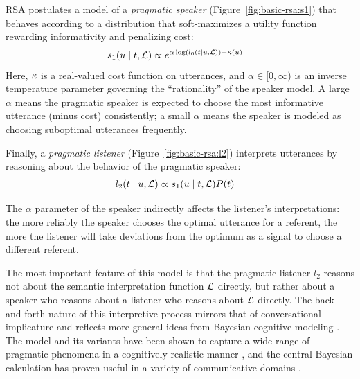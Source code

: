 \documentclass[11pt,letterpaper]{article}
\newcommand{\term}{\textit}
\newcommand{\utt}{u}
\newcommand{\target}{t}
\renewcommand{\|}{\mid}
\newcommand{\figref}[1]{Figure~\ref{#1}}
\begin{document}
RSA postulates a model of a \term{pragmatic speaker} (\figref{fig:basic-rsa:s1}) that
behaves according to a distribution that soft-maximizes
a utility function rewarding informativity and penalizing cost:
\begin{align}
  s_{1}(\utt \| \target, \Lex)
  &\propto
  e^{\alpha\log(l_{0}(\target \| \utt, \Lex)) - \Costs(\utt)}
  \label{eq:rsa-s1}
\end{align}
Here, $\kappa$ is a real-valued cost function on utterances, and
$\alpha \in [0,\infty)$ is an inverse temperature parameter governing
the ``rationality'' of the speaker model.
A large $\alpha$ means the pragmatic speaker is expected to choose
the most informative utterance (minus cost)
consistently; a small $\alpha$ means the
speaker is modeled as choosing suboptimal utterances frequently.

Finally, a \term{pragmatic listener} (\figref{fig:basic-rsa:l2})
interprets utterances by reasoning about the behavior of the pragmatic speaker:
\begin{align}
  l_{2}(\target \| \utt, \Lex)
  &\propto
  s_{1}(\utt \| \target, \Lex) \targetPrior(\target)
  \label{eq:rsa-l2}
\end{align}

The $\alpha$ parameter of the speaker indirectly affects the
listener's interpretations: the more reliably the speaker
chooses the optimal utterance for a referent, the more the listener
will take deviations from the optimum as a signal to choose a
different referent.

The most important feature of this model is that the pragmatic
listener $l_{2}$ reasons not about the semantic interpretation
function $\mathcal{L}$ directly, but rather about a speaker who reasons about
a listener who reasons about $\mathcal{L}$ directly. The back-and-forth
nature of this interpretive process mirrors
that of conversational implicature \cite{Grice75} and
reflects more general ideas from Bayesian cognitive modeling
\cite{Tenenbaum-etal:2011}. The model and its variants have been shown
to capture a wide range of pragmatic phenomena in a cognitively
realistic manner
\cite{Goodman2013,Smith:Goodman:Frank:2013,Kao-etal:2014,Bergen:Levy:Goodman:2014},
and the central Bayesian calculation has proven useful in a variety of
communicative domains
\cite{Tellex2014a,Vogel:Potts:Jurafsky:2013}.
\end{document}
